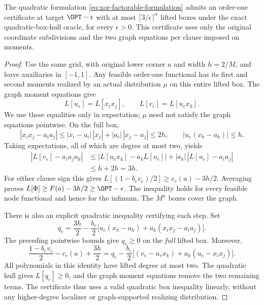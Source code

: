 \begin{proposition}
\label{prop:xor-order-one-upper}
The quadratic formulation \eqref{eq:xor-factorable-formulation} admits
an order-one certificate at target $\OPT-\epsilon$ with at most
$\lceil3/\epsilon\rceil^n$ lifted boxes under the exact quadratic-box-hull
oracle, for every $\epsilon>0$. This certificate uses only the original
coordinate subdivisions and the two graph equations per clause imposed
on moments.
\end{proposition}
\begin{proof}
Use the same grid, with original lower corner $a$ and width $h=2/M$,
and leave auxiliaries in $[-1,1]$. Any feasible order-one functional
has its first and second moments realized by an actual distribution $\mu$
on this entire lifted box. The graph moment equations give
\begin{equation}\label{eq:order-one-graph-moments}
 L[u_e]=L[x_ix_j],\qquad L[v_e]=L[u_ex_k].
\end{equation}
We use these equalities only in expectation; $\mu$ need not satisfy the
graph equations pointwise. On the full box,
\[
 |x_ix_j-a_ia_j|
 \le |x_i-a_i|\,|x_j|+|a_i|\,|x_j-a_j|\le2h,
 \qquad |u_e(x_k-a_k)|\le h.
\]
Taking expectations, all of which are degree at most two, yields
\begin{align}
 |L[v_e]-a_ia_ja_k|
 &\le |L[u_ex_k]-a_kL[u_e]|
          +|a_k|\,|L[u_e]-a_ia_j|\nonumber\\
 &\le h+2h=3h.\label{eq:order-one-corner-estimate}
\end{align}
For either clause sign this gives
$L[(1-b_ev_e)/2]\ge c_e(a)-3h/2$.
Averaging proves $L[\Phi]\ge F(a)-3h/2\ge\OPT-\epsilon$.
The inequality holds for every feasible node functional and hence for
the infimum. The $M^n$ boxes cover the graph.

There is also an explicit quadratic inequality certifying each step. Set
\begin{equation}\label{eq:order-one-quadratic-cut}
 q_e=\frac{3h}{2}-\frac{b_e}{2}
       \bigl[u_e(x_k-a_k)+a_k(x_ix_j-a_ia_j)\bigr].
\end{equation}
The preceding pointwise bounds give $q_e\ge0$ on the \emph{full} lifted
box. Moreover,
\begin{equation}\label{eq:order-one-cut-identity}
 \frac{1-b_ev_e}{2}-c_e(a)+\frac{3h}{2}
 =q_e-\frac{b_e}{2}
       \bigl[(v_e-u_ex_k)+a_k(u_e-x_ix_j)\bigr].
\end{equation}
All polynomials in this identity have lifted degree at most two. The
quadratic hull gives $L[q_e]\ge0$, and the graph moment equations remove
the two remaining terms. The certificate thus uses a valid quadratic box
inequality linearly, without any higher-degree localizer or
graph-supported realizing distribution.
\end{proof}

